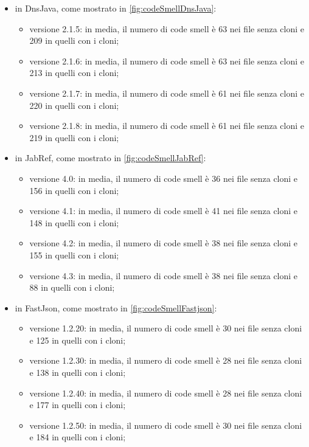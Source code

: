 \begin{itemize}
	\item in DnsJava, come mostrato in \autoref{fig:codeSmellDnsJava}:
	\begin{itemize}
		\item versione 2.1.5: in media, il numero di code smell è 63 nei file senza cloni e 209 in quelli con i cloni;
		\item versione 2.1.6: in media, il numero di code smell è 63 nei file senza cloni e 213 in quelli con i cloni;
		\item versione 2.1.7: in media, il numero di code smell è 61 nei file senza cloni e 220 in quelli con i cloni;
		\item versione 2.1.8: in media, il numero di code smell è 61 nei file senza cloni e 219 in quelli con i cloni;
	\end{itemize}
	\item in JabRef, come mostrato in \autoref{fig:codeSmellJabRef}:
	\begin{itemize}
		\item versione 4.0: in media, il numero di code smell è 36 nei file senza cloni e 156 in quelli con i cloni;
		\item versione 4.1: in media, il numero di code smell è 41 nei file senza cloni e 148 in quelli con i cloni;
		\item versione 4.2: in media, il numero di code smell è 38 nei file senza cloni e 155 in quelli con i cloni;
		\item versione 4.3: in media, il numero di code smell è 38 nei file senza cloni e 88 in quelli con i cloni;
	\end{itemize}
	\item in FastJson, come mostrato in \autoref{fig:codeSmellFastjson}:
	\begin{itemize}
		\item versione 1.2.20: in media, il numero di code smell è 30 nei file senza cloni e 125 in quelli con i cloni;
		\item versione 1.2.30: in media, il numero di code smell è 28 nei file senza cloni e 138 in quelli con i cloni;
		\item versione 1.2.40: in media, il numero di code smell è 28 nei file senza cloni e 177 in quelli con i cloni;
		\item versione 1.2.50: in media, il numero di code smell è 30 nei file senza cloni e 184 in quelli con i cloni;
	\end{itemize}
\end{itemize}
